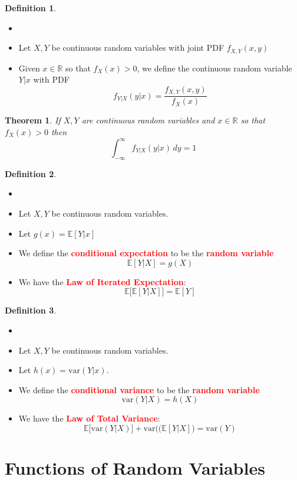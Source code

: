 \documentclass{article}
\newcommand{\R}{\mathbb{R}}
\newcommand{\E}{\mathbb{E}}
\newcommand{\var}{\text{var}}
\newcommand{\bfred}[1]{\textcolor{red}{\textbf{#1}}}
\theoremstyle{plain}
\newtheorem{thm}{Theorem}[section]
\theoremstyle{definition}
\newtheorem{defn}{Definition}[section]
\theoremstyle{remark}
\begin{document}
\begin{defn}
    \begin{itemize}
        \item []
        \item Let $X,Y$ be continuous random variables with joint PDF $f_{X,Y}(x,y)$
        \item Given $x\in\R$ so that $f_X(x)>0$, we define the continuous random variable $Y|x$ with PDF \[f_{Y|X}(y|x)=\frac{f_{X,Y}(x,y)}{f_X(x)}\]
    \end{itemize}
\end{defn}

\begin{thm}
    If $X,Y$ are continuous random variables and $x\in\R$ so that $f_X(x)>0$ then \[\int_{-\infty}^{\infty}f_{Y|X}(y|x)\,dy=1\]
\end{thm}

\begin{defn}
    \begin{itemize}
        \item []
        \item Let $X,Y$ be continuous random variables.
        \item Let $g(x) = \E[Y|x]$
        \item We define the \bfred{conditional expectation} to be the \bfred{random variable} \[\E[Y|X]=g(X)\]
        \item We have the \bfred{Law of Iterated Expectation}: \[\E\bigr[\E[Y|X]\bigr]=\E[Y]\]
    \end{itemize}
\end{defn}

\begin{defn}
    \begin{itemize}
        \item []
        \item Let $X,Y$ be continuous random variables.
        \item Let $h(x)=\var(Y|x)$.
        \item We define the \bfred{conditional variance} to be the \bfred{random variable} \[\var(Y|X)=h(X)\]
        \item We have the \bfred{Law of Total Variance}: \[\E\bigr[\var(Y|X)\bigr]+\var(\bigr(\E[Y|X]\bigr)=\var(Y)\]
    \end{itemize}
\end{defn}

\section{Functions of Random Variables}
\end{document}
